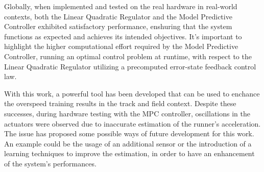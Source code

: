 \documentclass[a4paper,12pt,oneside]{book}
\begin{document}
Globally, when implemented and tested on the real hardware in real-world contexts, both the Linear Quadratic Regulator and the Model Predictive Controller exhibited satisfactory performance, enshuring that the system functions as expected and achieves its intended objectives.
It's important to highlight the higher computational effort required by the Model Predictive Controller, running an optimal control 
problem at runtime, with respect to the Linear Quadratic Regulator utilizing a precomputed error-state feedback control law.

With this work, a powerful tool has been developed that can be used to enchance the overspeed training results in the track and field context.
Despite these successes, during hardware testing with the MPC controller, oscillations in the actuators were observed due to inaccurate estimation of the runner's acceleration. 
The issue has proposed some possible ways of future development for this work.
An example could be the usage of an additional sensor or the introduction of a learning techniques to improve the estimation, in order to have an enhancement of the system's performances.


	





\printbibliography



\newpage
\end{document}
